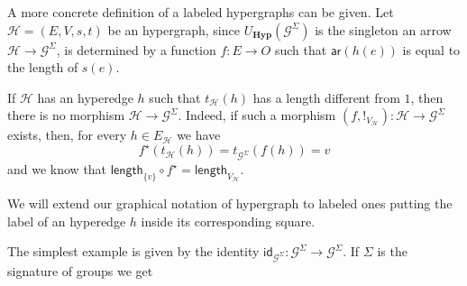 \documentclass[a4paper,UKenglish,cleveref,pdftex,thm-restate,numberwithinsect]{lipics-v2021}
\newcommand{\cat}[1]{\ensuremath{\mathbf{#1}}}
\newcommand{\id}[1]{\mathsf{id}_{#1}}
\newcommand{\hyp}{\cat{Hyp}}
\newcommand{\ari}[0]{\mathsf{ar}}
\newcommand{\lgt}[0]{\mathsf{length}}
\begin{document}
A more concrete definition of a labeled hypergraphs can be given. Let $\mathcal{H}=(E, V, s, t)$ be an hypergraph, since  $U_{\hyp}(\mathcal{G}^{\Sigma})$ is the singleton an arrow $\mathcal{H}\rightarrow \mathcal{G}^{\Sigma}$, is determined by a function $f:E\to O$  such that $\ari(h(e))$ is equal to the length of $s(e)$. 

\begin{remark}\label{rem:label}
	If  $\mathcal{H}$ has an hyperedge $h$ such that $t_{\mathcal{H}}(h)$ has a length different from $1$, then there is no morphism $\mathcal{H}\to \mathcal{G}^{\Sigma}$. Indeed, if such a morphism $(f,!_{V_\mathcal{H}}):\mathcal{H}\to \mathcal{G}^\Sigma$ exists, then, for every $h\in E_{\mathcal{H}}$ we have
	\[f^{\star}(t_{\mathcal{H}}(h))=t_{\mathcal{G}^{\Sigma}}(f(h))=v\] 
	and we know that $\lgt_{\{v\}}\circ f^{\star}=\lgt_{V_{\mathcal{H}}}$. 
\end{remark}

We will extend our graphical notation of hypergraph to labeled ones putting the label of an hyperedge $h$ inside its corresponding square.
\begin{example}\label{lab_1}
	The simplest example is given by the identity $\id{\mathcal{G}^\Sigma}:\mathcal{G}^\Sigma\rightarrow \mathcal{G}^{\Sigma}$. If $\Sigma$ is the signature of groups we get \begin{center}
	\end{center}
\end{example}
\end{document}
